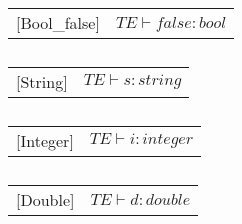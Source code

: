 \begin{table}[H]
    \centering
    \begin{longtable}[c] { r c }
        [Bool_{false}] & 
        \( {TE \vdash false : bool} \) \\
    \end{longtable}
    \caption{}\label{s-empty}
\end{table}

\begin{table}[H]
    \centering
    \begin{longtable}[c] { r c }
        [String] & 
        \( {TE \vdash s : string} \) \\
    \end{longtable}
    \caption{}\label{s-empty}
\end{table}

\begin{table}[H]
    \centering
    \begin{longtable}[c] { r c }
        [Integer] & 
        \( {TE \vdash i : integer} \) \\
    \end{longtable}
    \caption{}\label{s-empty}
\end{table} 

\begin{table}[H]
    \centering
    \begin{longtable}[c] { r c }
        [Double] & 
        \( {TE \vdash d : double} \) \\
    \end{longtable}
    \caption{}\label{s-empty}
\end{table} 


